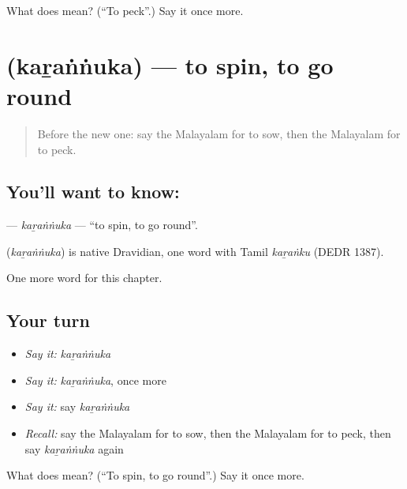 \begin{tcolorbox}[breakable,colback=teal!4,colframe=teal!35!black,title={Before you move on}]
What does  mean? (\textquotedblleft{}To peck\textquotedblright{}.) Say it once more.
\end{tcolorbox}
\section[\texorpdfstring{\ml{കറങ്ങുക} (kaṟaṅṅuka)}{കറങ്ങുക (kaṟaṅṅuka)}]{ (kaṟaṅṅuka) — to spin, to go round}

\label{lesson:ML-C273-karannuka}



\begin{quote}
Before the new one: say the Malayalam for to sow, then the Malayalam for to peck.
\end{quote}

\subsection*{You'll want to know: }
\textbf{} — \emph{kaṟaṅṅuka} — \textquotedblleft{}to spin, to go round\textquotedblright{}.

\begin{cousinweb}
\textbf{} (\emph{kaṟaṅṅuka}) is native Dravidian, one word with Tamil \emph{kaṟaṅku} (DEDR 1387).
\end{cousinweb}

\begin{grammarlens}[title={What you've built}]
One more word for this chapter.
\end{grammarlens}

\subsection*{Your turn}
\begin{itemize}
\raggedright
  \item \emph{Say it:} \emph{kaṟaṅṅuka}
  \item \emph{Say it:} \emph{kaṟaṅṅuka}, once more
  \item \emph{Say it:} say \emph{kaṟaṅṅuka}
  \item \emph{Recall:} say the Malayalam for to sow, then the Malayalam for to peck, then say \emph{kaṟaṅṅuka} again
\end{itemize}

\begin{tcolorbox}[breakable,colback=teal!4,colframe=teal!35!black,title={Before you move on}]
What does  mean? (\textquotedblleft{}To spin, to go round\textquotedblright{}.) Say it once more.
\end{tcolorbox}
